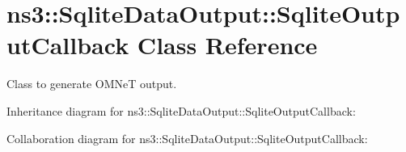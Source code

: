 \hypertarget{classns3_1_1SqliteDataOutput_1_1SqliteOutputCallback}{}\section{ns3\+:\+:Sqlite\+Data\+Output\+:\+:Sqlite\+Output\+Callback Class Reference}
\label{classns3_1_1SqliteDataOutput_1_1SqliteOutputCallback}


Class to generate O\+M\+NeT output.  




Inheritance diagram for ns3\+:\+:Sqlite\+Data\+Output\+:\+:Sqlite\+Output\+Callback\+:


Collaboration diagram for ns3\+:\+:Sqlite\+Data\+Output\+:\+:Sqlite\+Output\+Callback\+:
